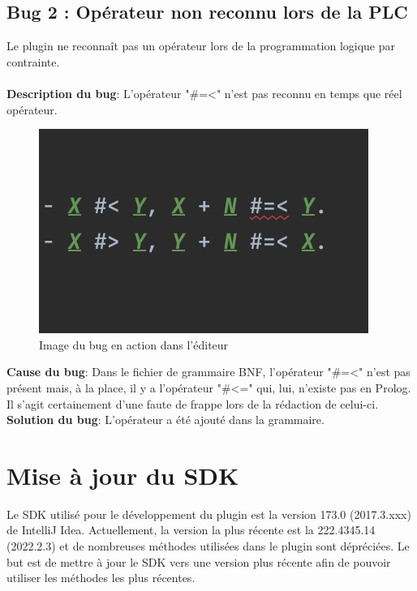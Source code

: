 \subsection{Bug 2 : Opérateur non reconnu lors de la PLC}
\noindent Le plugin ne reconnaît pas un opérateur lors de la programmation logique par contrainte.
\\
\\
\textbf{Description du bug}: L'opérateur "\#=<" n'est pas reconnu en temps que réel opérateur.
\\
\begin{figure}
    \centering
    \includegraphics[scale=.85]{images/PLC_error.png}
    \caption{Image du bug en action dans l'éditeur}
    \label{fig:bug_2_plc_op}
\end{figure}

\noindent \textbf{Cause du bug}: Dans le fichier de grammaire BNF, l'opérateur "\#=<" n'est pas présent mais, à la place, il y a l'opérateur "\#<=" qui, lui, n'existe pas en Prolog.
Il s'agit certainement d'une faute de frappe lors de la rédaction de celui-ci.
\\
\textbf{Solution du bug}: L'opérateur a été ajouté dans la grammaire.

\section{Mise à jour du SDK}
\noindent
Le SDK utilisé pour le développement du plugin est la version 173.0 (2017.3.xxx) de IntelliJ Idea.
Actuellement, la version la plus récente est la 222.4345.14 (2022.2.3) et de nombreuses méthodes utilisées dans le plugin sont dépréciées.
\newdoubleline Le but est de mettre à jour le SDK vers une version plus récente afin de pouvoir utiliser les méthodes les plus récentes.

